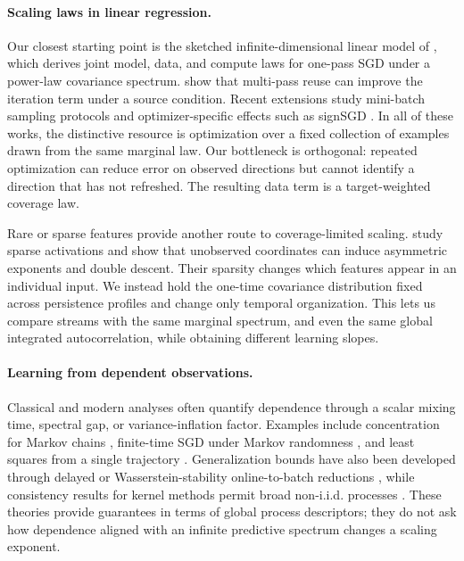 \paragraph{Scaling laws in linear regression.}
Our closest starting point is the sketched infinite-dimensional linear model
of \citet{lin2024scaling}, which derives joint model, data, and compute laws for
one-pass SGD under a power-law covariance spectrum.  \citet{lin2025reuse}
show that multi-pass reuse can improve the iteration term under a source
condition.  Recent extensions study mini-batch sampling protocols
\cite{chen2026minibatch} and optimizer-specific effects such as signSGD
\cite{kim2026signsgd}.  In all of these works, the distinctive resource is
optimization over a fixed collection of examples drawn from the same marginal
law.  Our bottleneck is orthogonal: repeated optimization can reduce error on
observed directions but cannot identify a direction that has not refreshed.
The resulting data term is a target-weighted coverage law.

Rare or sparse features provide another route to coverage-limited scaling.
\citet{sous2026sparse} study sparse activations and show that unobserved
coordinates can induce asymmetric exponents and double descent.  Their
sparsity changes which features appear in an individual input.  We instead
hold the one-time covariance distribution fixed across persistence profiles
and change only temporal organization.  This lets us compare streams with the
same marginal spectrum, and even the same global integrated autocorrelation,
while obtaining different learning slopes.

\paragraph{Learning from dependent observations.}
Classical and modern analyses often quantify dependence through a scalar
mixing time, spectral gap, or variance-inflation factor.  Examples include
concentration for Markov chains \cite{fan2021hoeffding}, finite-time SGD under
Markov randomness \cite{doan2020finite}, and least squares from a single
trajectory \cite{nagaraj2020markovian,sun2025single}.  Generalization bounds
have also been developed through delayed or Wasserstein-stability
online-to-batch reductions
\cite{abeles2025mixing,chatterjee2025dependent}, while consistency results for
kernel methods permit broad non-i.i.d. processes
\cite{massiani2024dependent}.  These theories provide guarantees in terms of
global process descriptors; they do not ask how dependence aligned with an
infinite predictive spectrum changes a scaling exponent.

